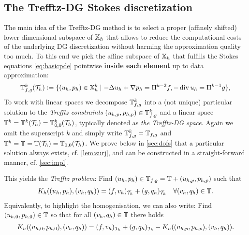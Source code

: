 \documentclass[pdflatex,sn-mathphys,Numbered]{sn-jnl}%
\theoremstyle{remark}%
\theoremstyle{definition}%
\begin{document}
\subsection{The Trefftz-DG Stokes discretization}
The main idea of the Trefftz-DG method is to select a proper (affinely
shifted) lower dimensional subspace of $\mathbb{X}_h$ that allows to reduce
the computational costs of the underlying DG discretization without
harming the approximation quality too much. To this end we pick the
affine subspace of $\mathbb{X}_h$ that fulfills the Stokes equations
\eqref{eq:basicpde} pointwise \textbf{inside each element} up to data
approximation:
\begin{equation}\label{eq:Trefftzconditions}
  \mathbb{T}^k_{f,g}({\mathcal{T}_h}) := \{ (u_h,p_h) \in \mathbb{X}^k_h \mid   -\Delta u_{h} + \nabla p_{h} = \Pi^{k-2} f, -\operatorname{\mathrm{div}} u_{h} = \Pi^{k-1} g\}, 
\end{equation}
To work with linear spaces we decompose $\mathbb{T}^k_{f,g}$ into a (not
unique) particular solution to the \emph{Trefftz constraints}
$(u_{h,p},p_{h,p}) \in \mathbb{T}^k_{f,g}$ and a linear space
$\mathbb{T}^k=\mathbb{T}^k({\mathcal{T}_h})=\mathbb{T}^k_{0,0}({\mathcal{T}_h})$, typically denoted as \emph{the
Trefftz-DG space}. Again we omit the superscript $k$ and simply write
$\mathbb{T}^k_{f,g} = \mathbb{T}_{f,g}$ and $\mathbb{T}^k=\mathbb{T}=\mathbb{T}({\mathcal{T}_h})=\mathbb{T}_{0,0}({\mathcal{T}_h})$.
We prove below in \cref{sec:dofs} that a particular solution always exists, cf. \cref{lem:surj}, and can be
constructed in a straight-forward manner, cf. \cref{sec:impl}.



This yields the \emph{Trefftz problem}: Find $(u_h,p_h) \in \mathbb{T}_{f,g}
=  \mathbb{T} + (u_{h,p},p_{h,p})$ such that
\begin{align} \label{eq:discreteTrefftz}
  K_h((u_h,p_h),(v_h,q_h)) = (f,v_h)_{{\mathcal{T}_h}} + (g,q_h)_{{\mathcal{T}_h}}\quad \forall (v_h,q_h) \in \mathbb{T}.
\end{align}
Equivalently, to highlight the homogenisation, we can also write:
Find $(u_{h,0},p_{h,0}) \in \mathbb{T}$ so that for all $(v_h,q_h) \in \mathbb{T}$ there holds 
\begin{align} \label{eq:discreteTrefftz0}
  K_h((u_{h,0},p_{h,0}),(v_{h},q_{h})) = (f,v_h)_{{\mathcal{T}_h}} + (g,q_h)_{{\mathcal{T}_h}} - K_h((u_{h,p},p_{h,p}),(v_{h},q_{h})).
\end{align}
\end{document}
